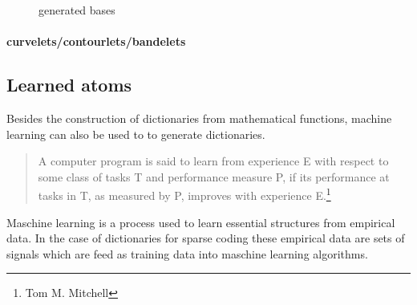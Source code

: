 \begin{figure}
\centering
{}
\hspace{5mm}
\hspace{5mm}
\caption{generated bases}

\label{fig:16_1000_lasso}
\end{figure}

\paragraph{curvelets/contourlets/bandelets}
\Todo{}

\subsection{Learned atoms}


Besides the construction of dictionaries from mathematical functions, machine
learning can also be used to to generate dictionaries.
\begin{quotation}
A computer program is said to learn from experience E with respect to
some class of tasks T and performance measure P, if its performance at tasks in
T, as measured by P, improves with experience E.\footnote{Tom M. Mitchell}
\end{quotation}
Maschine learning is a process used to learn essential structures from
empirical data. In the case of dictionaries for sparse coding these empirical
data are sets of signals which are feed as training data into maschine learning
algorithms.


